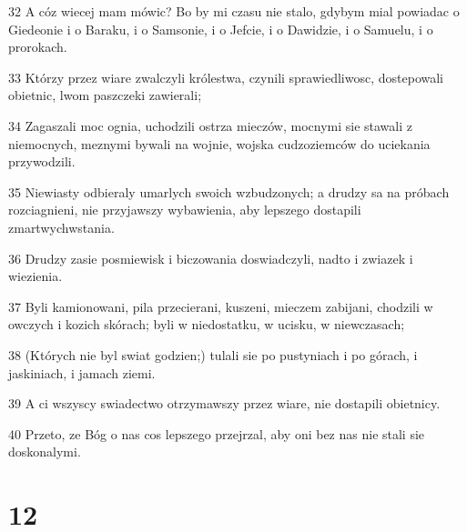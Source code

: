 \par 32 A cóz wiecej mam mówic? Bo by mi czasu nie stalo, gdybym mial powiadac o Giedeonie i o Baraku, i o Samsonie, i o Jefcie, i o Dawidzie, i o Samuelu, i o prorokach.
\par 33 Którzy przez wiare zwalczyli królestwa, czynili sprawiedliwosc, dostepowali obietnic, lwom paszczeki zawierali;
\par 34 Zagaszali moc ognia, uchodzili ostrza mieczów, mocnymi sie stawali z niemocnych, meznymi bywali na wojnie, wojska cudzoziemców do uciekania przywodzili.
\par 35 Niewiasty odbieraly umarlych swoich wzbudzonych; a drudzy sa na próbach rozciagnieni, nie przyjawszy wybawienia, aby lepszego dostapili zmartwychwstania.
\par 36 Drudzy zasie posmiewisk i biczowania doswiadczyli, nadto i zwiazek i wiezienia.
\par 37 Byli kamionowani, pila przecierani, kuszeni, mieczem zabijani, chodzili w owczych i kozich skórach; byli w niedostatku, w ucisku, w niewczasach;
\par 38 (Których nie byl swiat godzien;) tulali sie po pustyniach i po górach, i jaskiniach, i jamach ziemi.
\par 39 A ci wszyscy swiadectwo otrzymawszy przez wiare, nie dostapili obietnicy.
\par 40 Przeto, ze Bóg o nas cos lepszego przejrzal, aby oni bez nas nie stali sie doskonalymi.

\chapter{12}

